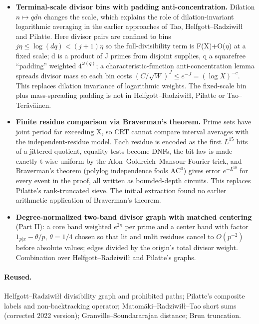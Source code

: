 \documentclass[11pt]{article}
\providecommand{\lt}{<}
\begin{document}
\begin{itemize}
\item \textbf{Terminal-scale divisor bins with padding anti-concentration.} Dilation $n\mapsto qdn$ changes the scale, which explains the role of dilation-invariant logarithmic averaging in the earlier approaches of Tao, Helfgott--Radziwi\l{}\l{} and Pilatte. Here divisor pairs are confined to bins $j\eta\le\log(dq)\lt(j+1)\eta$ so the full-divisibility term is F(X)+O($\eta$) at a fixed scale; d is a product of J primes from disjoint supplies, q a squarefree ``padding'' weighted $4^{\omega(q)}$; a characteristic-function anti-concentration lemma spreads divisor mass so each bin costs $(C/\sqrt W)^J\le e^{-J}=(\log X)^{-c}$. This replaces dilation invariance of logarithmic weights. The fixed-scale bin plus mass-spreading padding is not in Helfgott--Radziwi\l{}\l{}, Pilatte or Tao--Teräväinen.
\item \textbf{Finite residue comparison via Braverman's theorem.} Prime sets have joint period far exceeding X, so CRT cannot compare interval averages with the independent-residue model. Each residue is encoded as the first $L^{15}$ bits of a jittered quotient, equality tests become DNFs, the bit law is made exactly t-wise uniform by the Alon--Goldreich--Mansour Fourier trick, and Braverman's theorem (polylog independence fools $\mathrm{AC}^{0}$) gives error $e^{-L^{10}}$ for every event in the proof, all written as bounded-depth circuits. This replaces Pilatte's rank-truncated sieve. The initial extraction found no earlier arithmetic application of Braverman's theorem.
\item \textbf{Degree-normalized two-band divisor graph with matched centering} (Part II): a core band weighted $e^{2\kappa}$ per prime and a center band with factor $1_{p|x}-\theta/p$, $\theta=1/4$ chosen so that lit and unlit residues cancel to $O(p^{-2})$ before absolute values; edges divided by the origin's total divisor weight. Combination over Helfgott--Radziwi\l{}\l{} and Pilatte's graphs.
\end{itemize}

\paragraph{Reused.}

Helfgott--Radziwi\l{}\l{} divisibility graph and prohibited paths; Pilatte's composite labels and non-backtracking operator; Matomäki--Radziwi\l{}\l{}--Tao short sums (corrected 2022 version); Granville--Soundararajan distance; Brun truncation.
\end{document}
